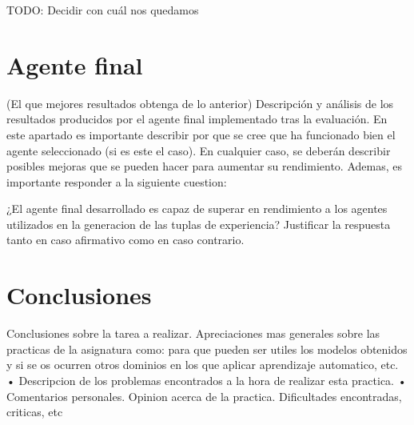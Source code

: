 \documentclass[12pt]{article}
\begin{document}
TODO: Decidir con cuál nos quedamos

\section{Agente final}
(El que mejores resultados obtenga de lo anterior)
Descripción y análisis de los resultados producidos por el agente final implementado tras la evaluación. En este apartado es importante describir por que se cree que ha funcionado bien el agente seleccionado (si es este el caso). En cualquier caso, se deberán describir posibles mejoras que se pueden hacer para aumentar su rendimiento. Ademas, es importante responder a la siguiente cuestion:
        
¿El agente final desarrollado es capaz de superar en rendimiento a los agentes utilizados en la generacion de las tuplas de experiencia? Justificar la respuesta tanto en caso afirmativo como en caso contrario.


\section{Conclusiones}
Conclusiones sobre la tarea a realizar.
Apreciaciones mas generales sobre las practicas de la asignatura como: para que pueden ser utiles los modelos obtenidos y si se os ocurren otros dominios en los que aplicar aprendizaje automatico, etc.
• Descripcion de los problemas encontrados a la hora de realizar esta practica.
• Comentarios personales. Opinion acerca de la practica. Dificultades encontradas, criticas, etc
\end{document}
